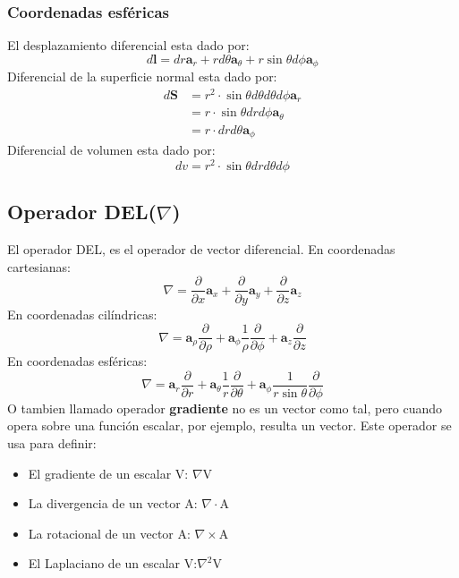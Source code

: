 \documentclass[
	11pt, %
	fleqn, %
	a4paper, %
]{LegrandOrangeBook}
\begin{document}
\subsubsection{Coordenadas esféricas}
El desplazamiento diferencial esta dado por:
\begin{equation}
\boxed{d\textbf{l}=dr\textbf{a}_r+r d\theta\textbf{a}_{\theta}+r\sin\theta d\phi\textbf{a}_{\phi}}
\end{equation}
Diferencial de la superficie normal esta dado por:
\begin{equation}
\boxed{\begin{split}
d\textbf{S}&=r^2\cdot\sin\theta d\theta d\theta d\phi \textbf{a}_r\\
&=r\cdot\sin\theta dr d\phi\textbf{a}_{\theta}\\
&=r\cdot dr d\theta\textbf{a}_{\phi}
\end{split}}
\end{equation}
Diferencial de volumen esta dado por:
\begin{equation}
\boxed{dv=r^2\cdot\sin\theta dr d\theta d\phi}
\end{equation}
\subsection{Operador DEL($\nabla$)}
El operador DEL, es el operador de vector diferencial. En coordenadas cartesianas:
\begin{equation}
\boxed{\nabla=\frac{\partial}{\partial x}\textbf{a}_x+\frac{\partial}{\partial y}\textbf{a}_y+\frac{\partial}{\partial z}\textbf{a}_z}
\end{equation}
En coordenadas cilíndricas:
\begin{equation}
\boxed{\nabla=\textbf{a}_{\rho}\frac{\partial}{\partial\rho}+\textbf{a}_{\phi}\frac{1}{\rho}\frac{\partial}{\partial\phi}+\textbf{a}_z\frac{\partial}{\partial z}}
\end{equation}
En coordenadas esféricas:
\begin{equation}
\boxed{\nabla=\textbf{a}_r\frac{\partial}{\partial r}+\textbf{a}_{\theta}\frac{1}{r}\frac{\partial}{\partial\theta}+\textbf{a}_{\phi}\frac{1}{r\sin\theta}\frac{\partial}{\partial \phi}}
\end{equation}
O tambien llamado operador \textbf{gradiente} no es un vector como tal, pero cuando opera sobre una función escalar, por ejemplo, resulta un vector. Este operador se usa para definir:
\begin{itemize}
\item El gradiente de un escalar V: $\nabla$V
\item La divergencia de un vector A: $\nabla\cdot$A
\item La rotacional de un vector A: $\nabla\times$A
\item El Laplaciano de un escalar V:$\nabla^2$V
\end{itemize}
\end{document}
